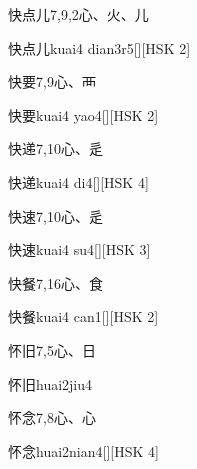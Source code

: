 \begin{entry}{快点儿}{7,9,2}{⼼、⽕、⼉}
  \begin{phonetics}{快点儿}{kuai4 dian3r5}[][HSK 2]
  \end{phonetics}
\end{entry}

\begin{entry}{快要}{7,9}{⼼、⾑}
  \begin{phonetics}{快要}{kuai4 yao4}[][HSK 2]
  \end{phonetics}
\end{entry}

\begin{entry}{快递}{7,10}{⼼、⾡}
  \begin{phonetics}{快递}{kuai4 di4}[][HSK 4]
  \end{phonetics}
\end{entry}

\begin{entry}{快速}{7,10}{⼼、⾡}
  \begin{phonetics}{快速}{kuai4 su4}[][HSK 3]
  \end{phonetics}
\end{entry}

\begin{entry}{快餐}{7,16}{⼼、⾷}
  \begin{phonetics}{快餐}{kuai4 can1}[][HSK 2]
  \end{phonetics}
\end{entry}

\begin{entry}{怀旧}{7,5}{⼼、⽇}
  \begin{phonetics}{怀旧}{huai2jiu4}
  \end{phonetics}
\end{entry}

\begin{entry}{怀念}{7,8}{⼼、⼼}
  \begin{phonetics}{怀念}{huai2nian4}[][HSK 4]
  \end{phonetics}
\end{entry}


